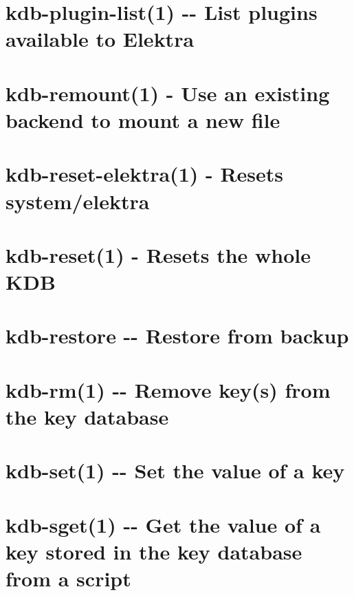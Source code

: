 \documentclass[twoside]{book}
\newcommand{\+}{\discretionary{\mbox{\scriptsize$\hookleftarrow$}}{}{}}
\begin{document}
\chapter{kdb-\/plugin-\/list(1) -\/-\/ List plugins available to Elektra}
\label{doc_help_kdb-plugin-list_md}

\chapter{kdb-\/remount(1) -\/ Use an existing backend to mount a new file}
\label{doc_help_kdb-remount_md}

\chapter{kdb-\/reset-\/elektra(1) -\/ Resets system/elektra}
\label{doc_help_kdb-reset-elektra_md}

\chapter{kdb-\/reset(1) -\/ Resets the whole K\+DB}
\label{doc_help_kdb-reset_md}

\chapter{kdb-\/restore -\/-\/ Restore from backup}
\label{doc_help_kdb-restore_md}

\chapter{kdb-\/rm(1) -\/-\/ Remove key(s) from the key database}
\label{doc_help_kdb-rm_md}

\chapter{kdb-\/set(1) -\/-\/ Set the value of a key}
\label{doc_help_kdb-set_md}

\chapter{kdb-\/sget(1) -\/-\/ Get the value of a key stored in the key database from a script}
\label{doc_help_kdb-sget_md}

\end{document}
